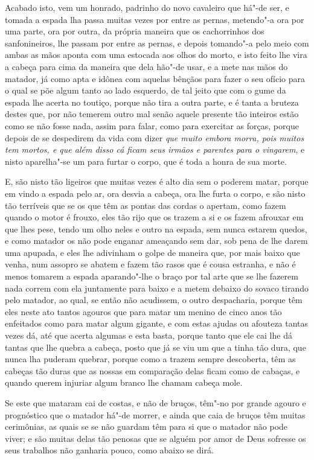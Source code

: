 \begin{linenumbers}
Acabado isto, vem um honrado, padrinho do novo cavaleiro que há"-de
ser, e tomada a espada lha passa muitas vezes por entre as pernas,
metendo"-a ora por uma parte, ora por outra, da própria maneira que os
cachorrinhos dos sanfonineiros, lhe passam por entre as pernas, e
depois tomando"-a pelo meio com ambas as mãos aponta com uma estocada
aos olhos do morto, e isto feito lhe vira a cabeça para cima da maneira
que dela hão"-de usar, e a mete nas mãos do matador, já como apta e
idônea com aquelas bênçãos para fazer o seu ofício para o qual se põe
algum tanto ao lado esquerdo, de tal jeito que com o gume da espada
lhe acerta no toutiço, porque não tira a outra parte, e é tanta a
bruteza destes que, por não temerem outro mal senão aquele presente tão
inteiros estão como se não fosse nada, assim para falar, como para
exercitar as forças, porque depois de se despedirem da vida com dizer
\textit{que muito embora morra, pois muitos tem mortos, e que além
disso cá ficam seus irmãos e parentes para o vingarem}, e nisto
aparelha"-se um para furtar o corpo, que é toda a honra de sua morte. 

E, são nisto tão ligeiros que muitas vezes é alto dia sem o poderem
matar, porque em vindo a espada pelo ar, ora desvia a cabeça, ora lhe
furta o corpo, e são nisto tão terríveis que se os que têm as pontas
das cordas o apertam, como fazem quando o motor é frouxo, eles tão rijo
que os trazem a si e os fazem afrouxar em que lhes pese, tendo um olho
neles e outro na espada, sem nunca estarem quedos, e como matador os
não pode enganar ameaçando sem dar, sob pena de lhe darem uma apupada,
e eles lhe adivinham o golpe de maneira que, por mais baixo que venha,
num assopro se abatem e fazem tão rasos que é cousa estranha, e não é
menos tomarem a espada aparando"-lhe o braço por tal arte que se lhe
fazerem nada correm com ela juntamente para baixo e a metem debaixo do
sovaco tirando pelo matador, ao qual, se então não acudissem, o outro
despacharia, porque têm eles neste ato tantos agouros que para matar
um menino de cinco anos tão enfeitados como para matar algum gigante, e
com estas ajudas ou afouteza tantas vezes dá, até que acerta algumas e
esta basta, porque tanto que ele cai lhe dá tantas que lhe quebra a
cabeça, posto que já se viu um que a tinha tão dura, que nunca lha
puderam quebrar, porque como a trazem sempre descoberta, têm as cabeças
tão duras que as nossas em comparação delas ficam como de cabaças, e
quando querem injuriar algum branco lhe chamam cabeça mole.

 Se este que mataram cai de costas, e não de bruços, têm"-no por grande
agouro e prognóstico que o matador há"-de morrer, e ainda que caia de
bruços têm muitas cerimônias, as quais se se não guardam têm para si
que o matador não pode viver; e são muitas delas tão penosas que se
alguém por amor de Deus sofresse os seus trabalhos não ganharia pouco,
como abaixo se dirá.


\end{linenumbers}
